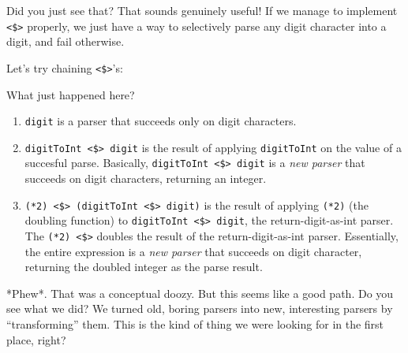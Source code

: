 \documentclass[]{article}
\newenvironment{Shaded}{}{}
\newcommand{\KeywordTok}[1]{\textcolor[rgb]{0.00,0.44,0.13}{\textbf{{#1}}}}
\newcommand{\DataTypeTok}[1]{\textcolor[rgb]{0.56,0.13,0.00}{{#1}}}
\newcommand{\DecValTok}[1]{\textcolor[rgb]{0.25,0.63,0.44}{{#1}}}
\newcommand{\StringTok}[1]{\textcolor[rgb]{0.25,0.44,0.63}{{#1}}}
\newcommand{\OtherTok}[1]{\textcolor[rgb]{0.00,0.44,0.13}{{#1}}}
\newcommand{\FunctionTok}[1]{\textcolor[rgb]{0.02,0.16,0.49}{{#1}}}
\newcommand{\NormalTok}[1]{{#1}}
\begin{document}
Did you just see that? That sounds genuinely useful! If we manage to implement
\texttt{\textless{}\$\textgreater{}} properly, we just have a way to selectively parse any digit
character into a digit, and fail otherwise.

Let's try chaining \texttt{\textless{}\$\textgreater{}}'s:

\begin{Shaded}
\end{Shaded}

What just happened here?

\begin{enumerate}
\def\labelenumi{\arabic{enumi}.}
\tightlist
\item
  \texttt{digit} is a parser that succeeds only on digit characters.
\item
  \texttt{digitToInt\ \textless{}\$\textgreater{}\ digit} is the result of applying
  \texttt{digitToInt} on the value of a succesful parse. Basically,
  \texttt{digitToInt\ \textless{}\$\textgreater{}\ digit} is a \emph{new parser} that succeeds on
  digit characters, returning an integer.
\item
  \texttt{(*2)\ \textless{}\$\textgreater{}\ (digitToInt\ \textless{}\$\textgreater{}\ digit)} is
  the result of applying \texttt{(*2)} (the doubling function) to
  \texttt{digitToInt\ \textless{}\$\textgreater{}\ digit}, the return-digit-as-int parser. The
  \texttt{(*2)\ \textless{}\$\textgreater{}} doubles the result of the return-digit-as-int parser.
  Essentially, the entire expression is a \emph{new parser} that succeeds on digit character,
  returning the doubled integer as the parse result.
\end{enumerate}

*Phew*. That was a conceptual doozy. But this seems like a good path. Do you see what we did? We
turned old, boring parsers into new, interesting parsers by ``transforming'' them. This is the kind
of thing we were looking for in the first place, right?
\end{document}
